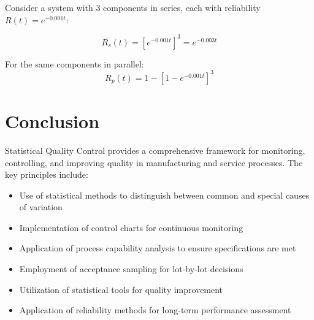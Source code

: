 \documentclass[twoside]{book}
\begin{document}
Consider a system with 3 components in series, each with reliability $R(t) = e^{-0.001t}$:

$$R_s(t) = [e^{-0.001t}]^3 = e^{-0.003t}$$

For the same components in parallel:
$$R_p(t) = 1 - [1 - e^{-0.001t}]^3$$

\begin{figure}[H]
\centering
{}
\end{figure}

\section{Conclusion}

Statistical Quality Control provides a comprehensive framework for monitoring, controlling, and improving quality in manufacturing and service processes. The key principles include:

\begin{itemize}
    \item Use of statistical methods to distinguish between common and special causes of variation
    \item Implementation of control charts for continuous monitoring
    \item Application of process capability analysis to ensure specifications are met
    \item Employment of acceptance sampling for lot-by-lot decisions
    \item Utilization of statistical tools for quality improvement
    \item Application of reliability methods for long-term performance assessment
\end{itemize}
\end{document}

